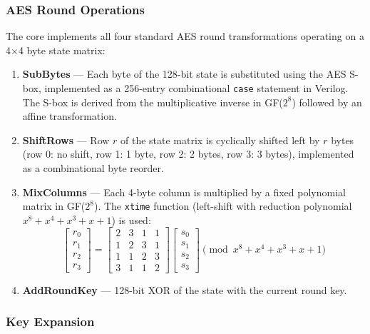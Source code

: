 \subsubsection{AES Round Operations}

The core implements all four standard AES round transformations operating on a 4$\times$4 byte state matrix:

\begin{enumerate}[leftmargin=*]
    \item \textbf{SubBytes} --- Each byte of the 128-bit state is substituted using the AES S-box, implemented as a 256-entry combinational \texttt{case} statement in Verilog. The S-box is derived from the multiplicative inverse in GF($2^8$) followed by an affine transformation.
    \item \textbf{ShiftRows} --- Row $r$ of the state matrix is cyclically shifted left by $r$ bytes (row 0: no shift, row 1: 1 byte, row 2: 2 bytes, row 3: 3 bytes), implemented as a combinational byte reorder.
    \item \textbf{MixColumns} --- Each 4-byte column is multiplied by a fixed polynomial matrix in GF($2^8$). The \texttt{xtime} function (left-shift with reduction polynomial $x^8+x^4+x^3+x+1$) is used:
    \begin{equation}
    \begin{bmatrix} r_0 \\ r_1 \\ r_2 \\ r_3 \end{bmatrix}
    =
    \begin{bmatrix} 2 & 3 & 1 & 1 \\ 1 & 2 & 3 & 1 \\ 1 & 1 & 2 & 3 \\ 3 & 1 & 1 & 2 \end{bmatrix}
    \begin{bmatrix} s_0 \\ s_1 \\ s_2 \\ s_3 \end{bmatrix}
    \pmod{x^8+x^4+x^3+x+1}
    \end{equation}
    \item \textbf{AddRoundKey} --- 128-bit XOR of the state with the current round key.
\end{enumerate}

\subsubsection{Key Expansion}

